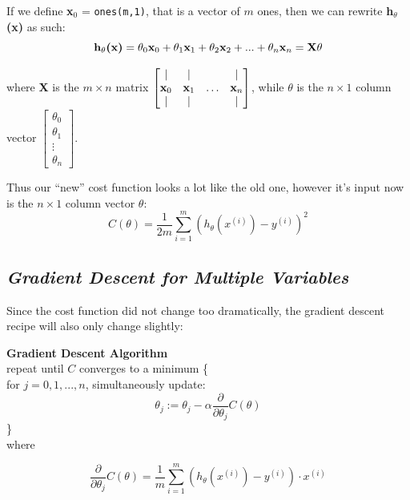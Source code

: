 \documentclass[11pt,a4paper,oneside]{report}
\begin{document}
If we define {\bf x}$_0$ = \verb+ones(m,1)+, that is a vector of $m$ ones, then we can rewrite {\bf h$_{\theta}$(x)} as such:
\[
\textnormal{{\bf h$_{\theta}$(x)}} = 
\theta_0 \textnormal{{\bf x}}_0 +
\theta_1 \textnormal{{\bf x}}_1 +
\theta_2 \textnormal{{\bf x}}_2 + ... +
\theta_n \textnormal{{\bf x}}_n
= \textnormal{{\bf X$\theta$}}
\]

where {\bf X} is the $m \times n$ matrix $\begin{bmatrix}
| & | & & |\\
\textnormal{{\bf x}}_0 & \textnormal{{\bf x}}_1 & \hdots & \textnormal{{\bf x}}_n\\
| & | & & |
\end{bmatrix}$, while $\theta$ is the $n \times 1$ column vector $\begin{bmatrix}
\theta_0\\
\theta_1\\
\vdots\\
\theta_n
\end{bmatrix}$.

Thus our ``new'' cost function looks a lot like the old one, however it's input now is the $n \times 1$ column vector $\theta$:
\[
C(\theta) = \frac{1}{2m}\sum\limits_{i=1}^m(h_{\theta} (x^{(i)}) - y^{(i)})^2
\]

{\center\color{magenta}
\subsection*{\it\huge Gradient Descent for Multiple Variables}}

Since the cost function did not change too dramatically, the gradient descent recipe will also only change slightly:

\begin{framed}
{\bf Gradient Descent Algorithm}\\

\noindent repeat until $C$ converges to a minimum \{\\
\indent for $j = 0,1,...,n$, simultaneously update:
\[
\theta_j := \theta_j - \alpha \frac{\partial}{\partial \theta_j} C(\theta)
\]
\}\\

where

\[
\frac{\partial}{\partial \theta_j}C(\theta) = \frac{1}{m}\sum\limits_{i=1}^m(h_{\theta}(x^{(i)})-y^{(i)})\cdot x^{(i)}
\]

\end{framed}
\end{document}
